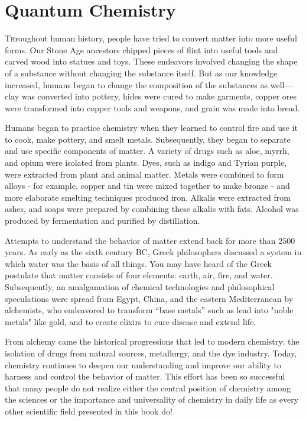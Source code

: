 	\newpage
	\thispagestyle{empty}
	\mbox{}
	\section{Quantum Chemistry}
	\lettrine[lines=4]{\color{BrickRed}T}hroughout human history, people have tried to convert matter into more useful forms. Our Stone Age ancestors chipped pieces of flint into useful tools and carved wood into statues and toys. These endeavors involved changing the shape of a substance without changing the substance itself. But as our knowledge increased, humans began to change the composition of the substances as well—clay was converted into pottery, hides were cured to make garments, copper ores were transformed into copper tools and weapons, and grain was made into bread.

	Humans began to practice chemistry when they learned to control fire and use it to cook, make pottery, and smelt metals. Subsequently, they began to separate and use specific components of matter. A variety of drugs such as aloe, myrrh, and opium were isolated from plants. Dyes, such as indigo and Tyrian purple, were extracted from plant and animal matter. Metals were combined to form alloys - for example, copper and tin were mixed together to make bronze - and more elaborate smelting techniques produced iron. Alkalis were extracted from ashes, and soaps were prepared by combining these alkalis with fats. Alcohol was produced by fermentation and purified by distillation.

	Attempts to understand the behavior of matter extend back for more than $2500$ years. As early as the sixth century BC, Greek philosophers discussed a system in which water was the basis of all things. You may have heard of the Greek postulate that matter consists of four elements: earth, air, fire, and water. Subsequently, an amalgamation of chemical technologies and philosophical speculations were spread from Egypt, China, and the eastern Mediterranean by alchemists, who endeavored to transform “base metals” such as lead into "noble metals" like gold, and to create elixirs to cure disease and extend life.

	From alchemy came the historical progressions that led to modern chemistry: the isolation of drugs from natural sources, metallurgy, and the dye industry. Today, chemistry continues to deepen our understanding and improve our ability to harness and control the behavior of matter. This effort has been so successful that many people do not realize either the central position of chemistry among the sciences or the importance and universality of chemistry in daily life as every other scientific field presented in this book do!
	
